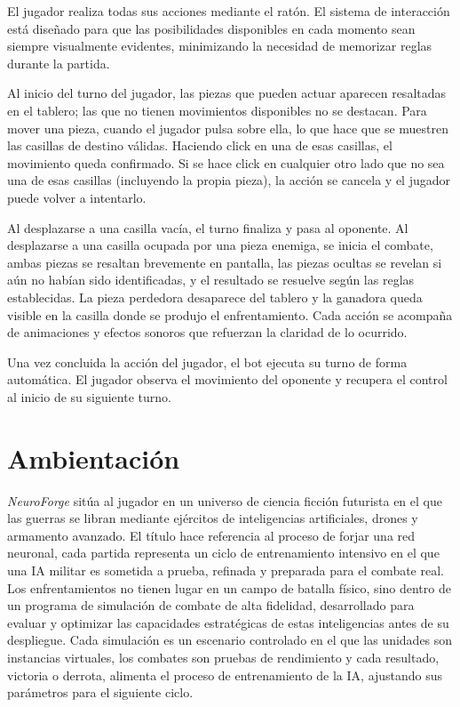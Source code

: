 El jugador realiza todas sus acciones mediante el ratón. El sistema de interacción está diseñado para que las posibilidades disponibles en cada momento sean siempre visualmente evidentes, minimizando la necesidad de memorizar reglas durante la partida.

Al inicio del turno del jugador, las piezas que pueden actuar aparecen resaltadas en el tablero; las que no tienen movimientos disponibles no se destacan. Para mover una pieza, cuando el jugador pulsa
sobre ella, lo que hace que se muestren las casillas de destino válidas. Haciendo click en una de esas casillas, el movimiento queda confirmado. Si se hace click en cualquier otro lado que no sea una de esas casillas (incluyendo la propia pieza), la acción se cancela y el jugador puede volver a intentarlo.

\clearpage

Al desplazarse a una casilla vacía, el turno finaliza y pasa al oponente. Al desplazarse a una casilla ocupada por una pieza enemiga, se inicia el combate, ambas piezas se resaltan brevemente en pantalla, las piezas ocultas se revelan si aún no habían sido identificadas, y el resultado se resuelve según las reglas establecidas. La pieza perdedora desaparece del tablero y la ganadora queda visible en la casilla donde se produjo el enfrentamiento. Cada acción se acompaña de animaciones y efectos sonoros que refuerzan la claridad de lo ocurrido.

Una vez concluida la acción del jugador, el bot ejecuta su turno de forma automática. El jugador observa el movimiento del oponente y recupera el control al inicio de su siguiente turno.

\section{Ambientación}

\textit{NeuroForge} sitúa al jugador en un universo de ciencia ficción futurista en el que las guerras se libran mediante ejércitos de inteligencias artificiales, drones y armamento avanzado. El título hace referencia al proceso de forjar una red neuronal, cada partida representa un ciclo de entrenamiento intensivo en el que una IA militar es sometida a prueba, refinada y preparada para el combate real. Los enfrentamientos no tienen lugar en un campo de batalla físico, sino dentro de un programa de simulación de combate de alta fidelidad, desarrollado para evaluar y optimizar las capacidades estratégicas de estas inteligencias antes de su despliegue. Cada simulación es un escenario controlado en el que las unidades son instancias virtuales, los combates son pruebas de rendimiento y cada resultado, victoria o derrota, alimenta el proceso de entrenamiento de la IA, ajustando sus parámetros para el siguiente ciclo.

